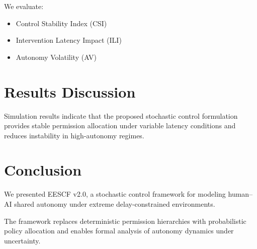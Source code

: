\documentclass[conference]{IEEEtran}
\begin{document}
We evaluate:

\begin{itemize}
\item Control Stability Index (CSI)
\item Intervention Latency Impact (ILI)
\item Autonomy Volatility (AV)
\end{itemize}

\section{Results Discussion}

Simulation results indicate that the proposed stochastic control formulation provides stable permission allocation under variable latency conditions and reduces instability in high-autonomy regimes.

\section{Conclusion}

We presented EESCF v2.0, a stochastic control framework for modeling human--AI shared autonomy under extreme delay-constrained environments.

The framework replaces deterministic permission hierarchies with probabilistic policy allocation and enables formal analysis of autonomy dynamics under uncertainty.
\end{document}
